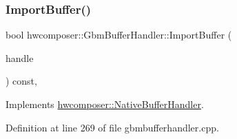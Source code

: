 \subsubsection{\texorpdfstring{Import\+Buffer()}{ImportBuffer()}}
{\footnotesize\ttfamily bool hwcomposer\+::\+Gbm\+Buffer\+Handler\+::\+Import\+Buffer (\begin{DoxyParamCaption}\item[{\mbox{\hyperlink{alios_2platformdefines_8h_ac0a2eaf260f556d17fe489911f017bdf}{H\+W\+C\+Native\+Handle}}}]{handle }\end{DoxyParamCaption}) const\hspace{0.3cm}{\ttfamily [override]}, {\ttfamily [virtual]}}



Implements \mbox{\hyperlink{classhwcomposer_1_1NativeBufferHandler_a5841be467d2aa11e8c4d7233596fda3c}{hwcomposer\+::\+Native\+Buffer\+Handler}}.



Definition at line 269 of file gbmbufferhandler.\+cpp.


